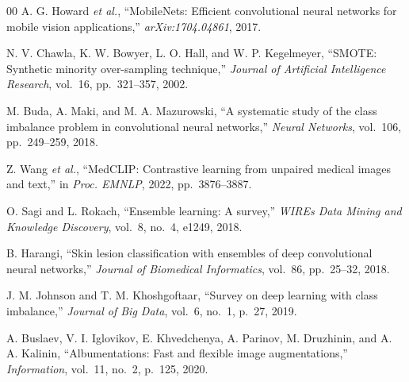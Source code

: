 \documentclass[conference]{IEEEtran}
\begin{document}
\begin{thebibliography}{00}
A. G. Howard \textit{et al.},
``MobileNets: Efficient convolutional neural networks for mobile vision
applications,''
\textit{arXiv:1704.04861}, 2017.

N. V. Chawla, K. W. Bowyer, L. O. Hall, and W. P. Kegelmeyer,
``SMOTE: Synthetic minority over-sampling technique,''
\textit{Journal of Artificial Intelligence Research}, vol.~16,
pp.~321--357, 2002.

M. Buda, A. Maki, and M. A. Mazurowski,
``A systematic study of the class imbalance problem in convolutional
neural networks,''
\textit{Neural Networks}, vol.~106, pp.~249--259, 2018.

Z. Wang \textit{et al.},
``MedCLIP: Contrastive learning from unpaired medical images and text,''
in \textit{Proc. EMNLP}, 2022, pp.~3876--3887.

O. Sagi and L. Rokach,
``Ensemble learning: A survey,''
\textit{WIREs Data Mining and Knowledge Discovery}, vol.~8, no.~4,
e1249, 2018.

B. Harangi,
``Skin lesion classification with ensembles of deep convolutional neural
networks,''
\textit{Journal of Biomedical Informatics}, vol.~86, pp.~25--32, 2018.

J. M. Johnson and T. M. Khoshgoftaar,
``Survey on deep learning with class imbalance,''
\textit{Journal of Big Data}, vol.~6, no.~1, p.~27, 2019.

A. Buslaev, V. I. Iglovikov, E. Khvedchenya, A. Parinov,
M. Druzhinin, and A. A. Kalinin,
``Albumentations: Fast and flexible image augmentations,''
\textit{Information}, vol.~11, no.~2, p.~125, 2020.

\end{thebibliography}
\end{document}

